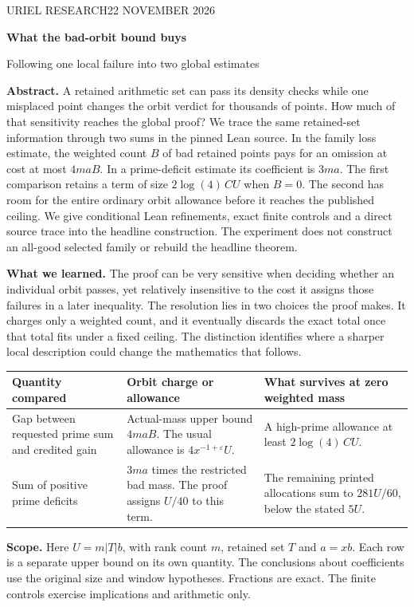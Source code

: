 \documentclass[12pt,letterpaper]{article}
\newcommand{\para}[1]{\par\medskip\noindent\textbf{#1}\quad}
\begin{document}
\thispagestyle{plain}
{\sffamily\small\color{accent}URIEL RESEARCH\hfill 22 NOVEMBER 2026}\par\vspace{14pt}
{\Huge\bfseries\color{ink}What the bad-orbit bound buys\par}\vspace{5pt}
{\Large\color{muted}Following one local failure into two global estimates}\par\bigskip
\textbf{Abstract.} A retained arithmetic set can pass its density checks while one misplaced point changes the orbit verdict for thousands of points. How much of that sensitivity reaches the global proof? We trace the same retained-set information through two sums in the pinned Lean source. In the family loss estimate, the weighted count \(B\) of bad retained points pays for an omission at cost at most \(4maB\). In a prime-deficit estimate its coefficient is \(3ma\). The first comparison retains a term of size \(2\log(4)\,C U\) when \(B=0\). The second has room for the entire ordinary orbit allowance before it reaches the published ceiling. We give conditional Lean refinements, exact finite controls and a direct source trace into the headline construction. The experiment does not construct an all-good selected family or rebuild the headline theorem.

\para{What we learned.} The proof can be very sensitive when deciding whether an individual orbit passes, yet relatively insensitive to the cost it assigns those failures in a later inequality. The resolution lies in two choices the proof makes. It charges only a weighted count, and it eventually discards the exact total once that total fits under a fixed ceiling. The distinction identifies where a sharper local description could change the mathematics that follows.

\medskip
\begin{tabularx}{\linewidth}{@{} >{\raggedright\arraybackslash}p{.25\linewidth}YY@{}}
\toprule
Quantity compared & Orbit charge or allowance & What survives at zero weighted mass\\ \midrule
Gap between requested prime sum and credited gain
& Actual-mass upper bound \(4maB\). The usual allowance is \(4x^{-1+\varepsilon}U\).
& A high-prime allowance at least \(2\log(4)\,C U\).\\[3pt]
Sum of positive prime deficits
& \(3ma\) times the restricted bad mass. The proof assigns \(U/40\) to this term.
& The remaining printed allocations sum to \(281U/60\), below the stated \(5U\).\\ \bottomrule
\end{tabularx}
\para{Scope.} Here \(U=m|T|b\), with rank count \(m\), retained set \(T\) and \(a=xb\). Each row is a separate upper bound on its own quantity. The conclusions about coefficients use the original size and window hypotheses. Fractions are exact. The finite controls exercise implications and arithmetic only.
\end{document}
